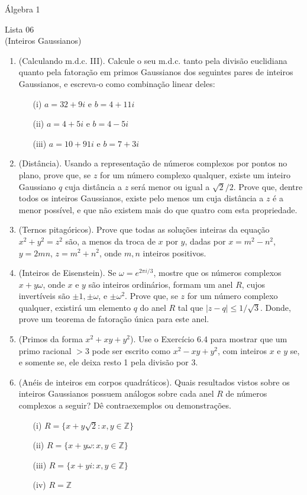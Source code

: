 \documentclass[a4paper,12pt]{article}
\begin{document}
\begin{center}
    Álgebra 1
\end{center}

\begin{center}
    \large Lista 06 \\
    \small (Inteiros Gaussianos)
\end{center}

\begin{enumerate}[label=6.\arabic*.]
    \item (Calculando m.d.c. III). Calcule o seu m.d.c. tanto pela divisão euclidiana quanto pela fatoração em primos Gaussianos dos seguintes pares de inteiros Gaussianos, e escreva-o como combinação linear deles:
    \begin{itemize}
        \item[(i)] $a = 32 + 9i$ e $b = 4 + 11i$
        \item[(ii)] $a = 4 + 5i$ e $b = 4 - 5i$
        \item[(iii)] $a = 10 + 91i$ e $b = 7 + 3i$
    \end{itemize}
    \item (Distância). Usando a representação de números complexos por pontos no plano, prove que, se $z$ for um número complexo qualquer, existe um inteiro Gaussiano $q$ cuja distância a $z$ será menor ou igual a $\sqrt{2}/2$. Prove que, dentre todos os inteiros Gaussianos, existe pelo menos um cuja distância a $z$ é a menor possível, e que não existem mais do que quatro com esta propriedade.
    \item (Ternos pitagóricos). Prove que todas as soluções inteiras da equação $x^2 + y^2 = z^2$ são, a menos da troca de $x$ por $y$, dadas por $x = m^2 - n^2$, $y = 2mn$, $z = m^2 + n^2$, onde $m, n$ inteiros positivos.
    \item (Inteiros de Eisenstein). Se $\omega = e^{2 \pi i /3}$, mostre que os números complexos $x + y\omega$, onde $x$ e $y$ são inteiros ordinários, formam um anel $R$, cujos invertíveis são $\pm 1, \pm \omega$, e $\pm \omega^2$. Prove que, se $z$ for um número complexo qualquer, existirá um elemento $q$ do anel $R$ tal que $|z - q| \leq 1/\sqrt{3}$. Donde, prove um teorema de fatoração única para este anel.
    \item (Primos da forma $x^2 + xy + y^2$). Use o Exercício 6.4 para mostrar que um primo racional $> 3$ pode ser escrito como $x^2-xy+y^2$, com inteiros $x$ e $y$ se, e somente se, ele deixa resto 1 pela divisão por 3.
    \item (Anéis de inteiros em corpos quadráticos). Quais resultados vistos sobre os inteiros Gaussianos possuem análogos sobre cada anel $R$ de números complexos a seguir? Dê contraexemplos ou demonstrações.
    \begin{itemize}
        \item[(i)] $R = \{ x + y\sqrt{2} : x, y \in \mathbb{Z} \}$
        \item[(ii)] $R = \{ x + y \omega : x, y \in \mathbb{Z} \}$
        \item[(iii)] $R = \{ x + y i : x, y \in \mathbb{Z} \}$
        \item[(iv)] $R = \mathbb{Z}$
    \end{itemize}
\end{enumerate}
\end{document}
